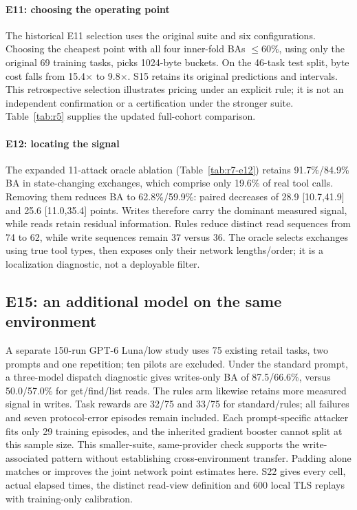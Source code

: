 

\paragraph{E11: choosing the operating point}
The historical E11 selection uses the original suite and six configurations. Choosing the cheapest point with all four inner-fold BAs $\leq60\%$, using only the original 69 training tasks, picks 1024-byte buckets. On the 46-task test split, byte cost falls from 15.4$\times$ to 9.8$\times$. S15 retains its original predictions and intervals. This retrospective selection illustrates pricing under an explicit rule; it is not an independent confirmation or a certification under the stronger suite. Table~\ref{tab:r5} supplies the updated full-cohort comparison.

\paragraph{E12: locating the signal}
The expanded 11-attack oracle ablation (Table~\ref{tab:r7-e12}) retains 91.7\%/84.9\% BA in state-changing exchanges, which comprise only 19.6\% of real tool calls. Removing them reduces BA to 62.8\%/59.9\%: paired decreases of 28.9 [10.7,41.9] and 25.6 [11.0,35.4] points. Writes therefore carry the dominant measured signal, while reads retain residual information. Rules reduce distinct read sequences from 74 to 62, while write sequences remain 37 versus 36. The oracle selects exchanges using true tool types, then exposes only their network lengths/order; it is a localization diagnostic, not a deployable filter.




\subsection{E15: an additional model on the same environment}
A separate 150-run GPT-6 Luna/low study uses 75 existing retail tasks, two prompts and one repetition; ten pilots are excluded. Under the standard prompt, a three-model dispatch diagnostic gives writes-only BA of 87.5/66.6\%, versus 50.0/57.0\% for get/find/list reads. The rules arm likewise retains more measured signal in writes. Task rewards are 32/75 and 33/75 for standard/rules; all failures and seven protocol-error episodes remain included. Each prompt-specific attacker fits only 29 training episodes, and the inherited gradient booster cannot split at this sample size. This smaller-suite, same-provider check supports the write-associated pattern without establishing cross-environment transfer. Padding alone matches or improves the joint network point estimates here. S22 gives every cell, actual elapsed times, the distinct read-view definition and 600 local TLS replays with training-only calibration.

